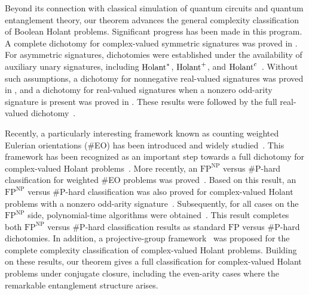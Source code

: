 Beyond its connection with classical simulation of quantum circuits and quantum entanglement theory, our theorem advances the general complexity classification of Boolean Holant problems. 
Significant progress has been made in this program. A complete dichotomy for complex-valued symmetric signatures was proved in \cite{cai-guo-tyson-vanishing}. For asymmetric signatures, dichotomies were established under the availability of auxiliary unary signatures, including $\operatorname{Holant}^\ast$, $\operatorname{Holant}^+$, and $\operatorname{Holant}^c$~\cite{cai-lu-xia-holant-star,Backens-holant-plus,real_holantc,Backens-Holant-c}. Without such assumptions, a dichotomy for nonnegative real-valued signatures was proved in \cite{Lin_Wang_Decomposition_lemma}, and a dichotomy for real-valued signatures when a nonzero odd-arity signature is present was proved in \cite{odd_holant_real}. These results were followed by the full real-valued dichotomy~\cite{realholant}. 


Recently, a particularly interesting framework known as counting weighted Eulerian orientations (\#EO) has been introduced and widely studied~\cite{cai-fu-shao-eo,ShaoTang25,MengWX25}. This framework has been recognized as an important step towards a full dichotomy for complex-valued Holant problems~\cite{Holant_Odd,GSS26}.
More recently, an $\mathrm{FP}^{\mathrm{NP}}$ versus \#P-hard classification for weighted \#EO problems was proved~\cite{MengWX25}. Based on this result, an $\mathrm{FP}^{\mathrm{NP}}$ versus \#P-hard classification was also proved for complex-valued Holant problems with a nonzero odd-arity signature~\cite{Holant_Odd}. Subsequently,  for all cases on the $\mathrm{FP}^{\mathrm{NP}}$ side,  polynomial-time algorithms were obtained~\cite{GSS26}. This result completes both $\mathrm{FP}^{\mathrm{NP}}$ versus \#P-hard  classification results as standard $\mathrm{FP}$ versus \#P-hard dichotomies. In addition, a projective-group framework~\cite{MingjiProgram} was proposed for the complete complexity classification of complex-valued Holant problems.
Building on these results, our theorem gives a full classification for complex-valued Holant problems under conjugate closure, including the even-arity cases where the remarkable entanglement structure arises.



